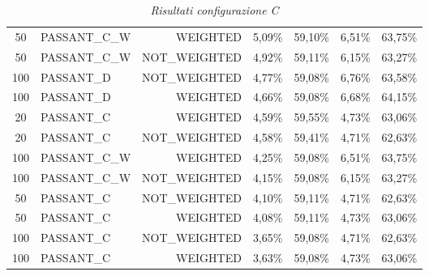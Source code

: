 \begin{table}[H]
{\begin{tabular}{ c l r c c c c }
			50 & PASSANT\_C\_W &   WEIGHTED &     5,09\% &    59,10\% &     6,51\% &    63,75\% \\
			
			50 & PASSANT\_C\_W & NOT\_WEIGHTED &     4,92\% &    59,11\% &     6,15\% &    63,27\% \\
			
			100 &  PASSANT\_D & NOT\_WEIGHTED &     4,77\% &    59,08\% &     6,76\% &    63,58\% \\
			
			100 &  PASSANT\_D &   WEIGHTED &     4,66\% &    59,08\% &     6,68\% &    64,15\% \\
			
			20 &  PASSANT\_C &   WEIGHTED &     4,59\% &    59,55\% &     4,73\% &    63,06\% \\
			
			20 &  PASSANT\_C & NOT\_WEIGHTED &     4,58\% &    59,41\% &     4,71\% &    62,63\% \\
			
			100 & PASSANT\_C\_W &   WEIGHTED &     4,25\% &    59,08\% &     6,51\% &    63,75\% \\
			
			100 & PASSANT\_C\_W & NOT\_WEIGHTED &     4,15\% &    59,08\% &     6,15\% &    63,27\% \\
			
			50 &  PASSANT\_C & NOT\_WEIGHTED &     4,10\% &    59,11\% &     4,71\% &    62,63\% \\
			
			50 &  PASSANT\_C &   WEIGHTED &     4,08\% &    59,11\% &     4,73\% &    63,06\% \\
			
			100 &  PASSANT\_C & NOT\_WEIGHTED &     3,65\% &    59,08\% &     4,71\% &    62,63\% \\
			
			100 &  PASSANT\_C &   WEIGHTED &     3,63\% &    59,08\% &     4,73\% &    63,06\% \\
			\bottomrule
		\end{tabular}  		 	
	}
	\caption{\emph{Risultati configurazione C}}
\end{table}


